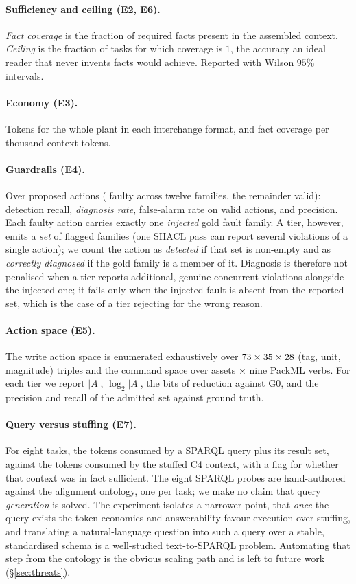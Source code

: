 \paragraph{Sufficiency and ceiling (E2, E6).} \emph{Fact coverage} is the
fraction of required facts present in the assembled context. \emph{Ceiling} is
the fraction of tasks for which coverage is $1$, the accuracy an ideal reader
that never invents facts would achieve. Reported with Wilson $95\%$ intervals.

\paragraph{Economy (E3).} Tokens for the whole plant in each interchange format,
and fact coverage per thousand context tokens.

\paragraph{Guardrails (E4).} Over \NCases{} proposed actions (\NFaulty{} faulty
across twelve families, the remainder valid): detection recall, \emph{diagnosis
rate}, false-alarm rate on valid actions, and precision. Each faulty action
carries exactly one \emph{injected} gold fault family. A tier, however, emits a
\emph{set} of flagged families (one SHACL pass can report several violations of a
single action); we count the action as \emph{detected} if that set is non-empty
and as \emph{correctly diagnosed} if the gold family is a member of it. Diagnosis
is therefore not penalised when a tier reports additional, genuine concurrent
violations alongside the injected one; it fails only when the injected fault is
absent from the reported set, which is the case of a tier rejecting for the wrong
reason.

\paragraph{Action space (E5).} The write action space is enumerated exhaustively
over $73{} \times 35 \times 28$ (tag, unit, magnitude) triples and the
command space over assets $\times$ nine PackML verbs. For each tier we report
$|A|$, $\log_2|A|$, the bits of reduction against G0, and the precision and
recall of the admitted set against ground truth.

\paragraph{Query versus stuffing (E7).} For eight tasks, the tokens consumed by a
SPARQL query plus its result set, against the tokens consumed by the stuffed C4
context, with a flag for whether that context was in fact sufficient. The eight
SPARQL probes are hand-authored against the alignment ontology, one per task; we
make no claim that query \emph{generation} is solved. The experiment isolates a
narrower point, that \emph{once} the query exists the token economics and
answerability favour execution over stuffing, and translating a natural-language
question into such a query over a stable, standardised schema is a well-studied
text-to-SPARQL problem. Automating that step from the ontology is the obvious
scaling path and is left to future work (\S\ref{sec:threats}).

